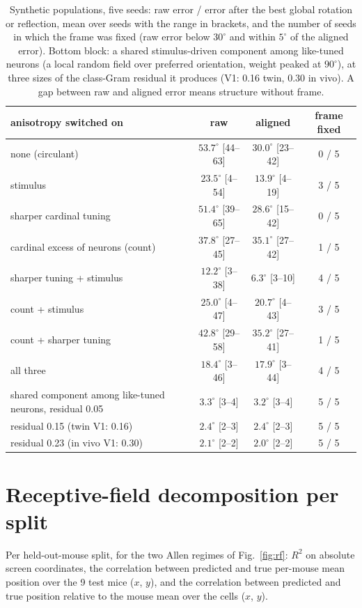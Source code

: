 \documentclass[11pt]{article}
\newcommand{\Rsq}{R^{2}}
\begin{document}
\begin{table}[htbp]
  \centering\footnotesize
  \caption{Synthetic populations, five seeds: raw error / error after the best global rotation or reflection, mean over seeds with the range in brackets, and the number of seeds in which the frame was fixed (raw error below $30^\circ$ and within $5^\circ$ of the aligned error). Bottom block: a shared stimulus-driven component among like-tuned neurons (a local random field over preferred orientation, weight peaked at $90^\circ$), at three sizes of the class-Gram residual it produces (V1: 0.16 twin, 0.30 in vivo). A gap between raw and aligned error means structure without frame.}
  \label{tab:syn}
  \begin{tabular}{lccc}
    \toprule
    anisotropy switched on & raw & aligned & frame fixed \\
    \midrule
    none (circulant) & $53.7^\circ$ [44--63] & $30.0^\circ$ [23--42] & 0 / 5 \\
    stimulus & $23.5^\circ$ [4--54] & $13.9^\circ$ [4--19] & 3 / 5 \\
    sharper cardinal tuning & $51.4^\circ$ [39--65] & $28.6^\circ$ [15--42] & 0 / 5 \\
    cardinal excess of neurons (count) & $37.8^\circ$ [27--45] & $35.1^\circ$ [27--42] & 1 / 5 \\
    sharper tuning + stimulus & $12.2^\circ$ [3--38] & $6.3^\circ$ [3--10] & 4 / 5 \\
    count + stimulus & $25.0^\circ$ [4--47] & $20.7^\circ$ [4--43] & 3 / 5 \\
    count + sharper tuning & $42.8^\circ$ [29--58] & $35.2^\circ$ [27--41] & 1 / 5 \\
    all three & $18.4^\circ$ [3--46] & $17.9^\circ$ [3--44] & 4 / 5 \\
    \midrule
    shared component among like-tuned neurons, residual 0.05 & $3.3^\circ$ [3--4] & $3.2^\circ$ [3--4] & 5 / 5 \\
    \quad residual 0.15 (twin V1: 0.16) & $2.4^\circ$ [2--3] & $2.4^\circ$ [2--3] & 5 / 5 \\
    \quad residual 0.23 (in vivo V1: 0.30) & $2.1^\circ$ [2--2] & $2.0^\circ$ [2--2] & 5 / 5 \\
    \bottomrule
  \end{tabular}
\end{table}

\section{Receptive-field decomposition per split}\label{app:rfsplits}
Per held-out-mouse split, for the two Allen regimes of Fig.~\ref{fig:rf}: $\Rsq$ on absolute screen coordinates, the correlation between predicted and true per-mouse mean position over the 9 test mice ($x$, $y$), and the correlation between predicted and true position relative to the mouse mean over the cells ($x$, $y$).
\end{document}
